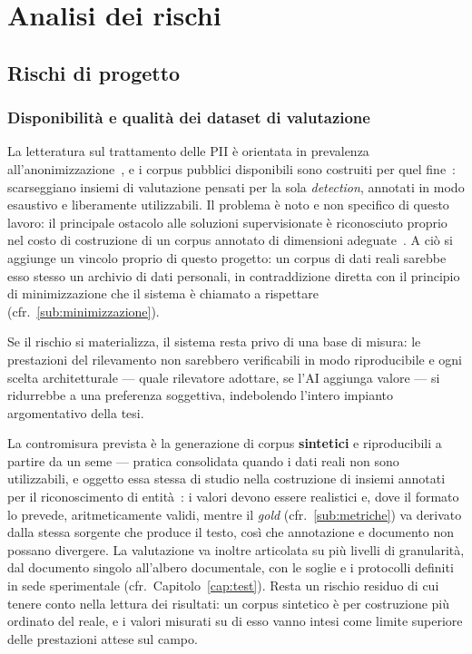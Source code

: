 \chapter{Analisi dei rischi}
\label{cap:analisi-rischi}


\section{Rischi di progetto}
\label{sec:rischi-progetto}

\subsection{Disponibilità e qualità dei dataset di valutazione}
\label{sub:rischio-dataset}
La letteratura sul trattamento delle PII è orientata in prevalenza all'anonimizzazione~\cite{lisonAnonymisationModelsText2021}, e i corpus pubblici disponibili sono costruiti per quel fine~\cite{pilanTextAnonymizationBenchmark2022}: scarseggiano insiemi di valutazione pensati per la sola \textit{detection}, annotati in modo esaustivo e liberamente utilizzabili. Il problema è noto e non specifico di questo lavoro: il principale ostacolo alle soluzioni supervisionate è riconosciuto proprio nel costo di costruzione di un corpus annotato di dimensioni adeguate~\cite{africanoPIIDetectionLowResource2024}. A ciò si aggiunge un vincolo proprio di questo progetto: un corpus di dati reali sarebbe esso stesso un archivio di dati personali, in contraddizione diretta con il principio di minimizzazione che il sistema è chiamato a rispettare (cfr.~\ref{sub:minimizzazione}). \medskip

Se il rischio si materializza, il sistema resta privo di una base di misura: le prestazioni del rilevamento non sarebbero verificabili in modo riproducibile e ogni scelta architetturale --- quale rilevatore adottare, se l'AI aggiunga valore --- si ridurrebbe a una preferenza soggettiva, indebolendo l'intero impianto argomentativo della tesi. \medskip

La contromisura prevista è la generazione di corpus \textbf{sintetici} e riproducibili a partire da un seme --- pratica consolidata quando i dati reali non sono utilizzabili, e oggetto essa stessa di studio nella costruzione di insiemi annotati per il riconoscimento di entità~\cite{hengProgGenGeneratingNamed2024}: i valori devono essere realistici e, dove il formato lo prevede, aritmeticamente validi, mentre il \textit{gold} (cfr.~\ref{sub:metriche}) va derivato dalla stessa sorgente che produce il testo, così che annotazione e documento non possano divergere. La valutazione va inoltre articolata su più livelli di granularità, dal documento singolo all'albero documentale, con le soglie e i protocolli definiti in sede sperimentale (cfr.~Capitolo~\ref{cap:test}). Resta un rischio residuo di cui tenere conto nella lettura dei risultati: un corpus sintetico è per costruzione più ordinato del reale, e i valori misurati su di esso vanno intesi come limite superiore delle prestazioni attese sul campo.

